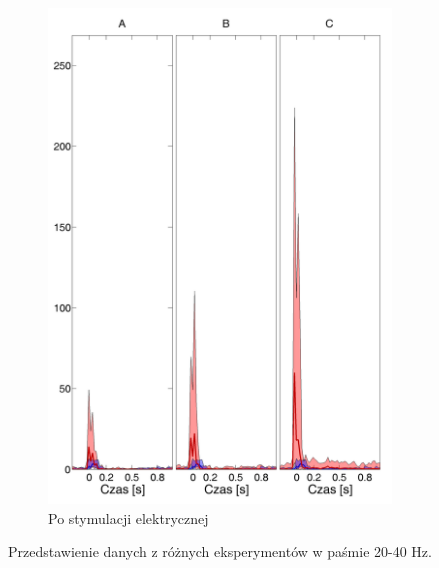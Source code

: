 \documentclass{pracamgr_2}
\begin{document}
\begin{figure}[h]
\begin{subfigure}{.5\textwidth}
			\includegraphics[width=1.\linewidth]{beta3_20-40_z_CxC5_do_SC42.png}
			\caption{Po stymulacji elektrycznej}
			\label{rys:20_40_beta_CxC_SC}
		\end{subfigure}
		\caption{Przedstawienie danych z różnych eksperymentów w paśmie 20-40 Hz.}
		\label{rys:20_40_CxC_SC}
	\end{figure}
	\FloatBarrier
\end{document}
